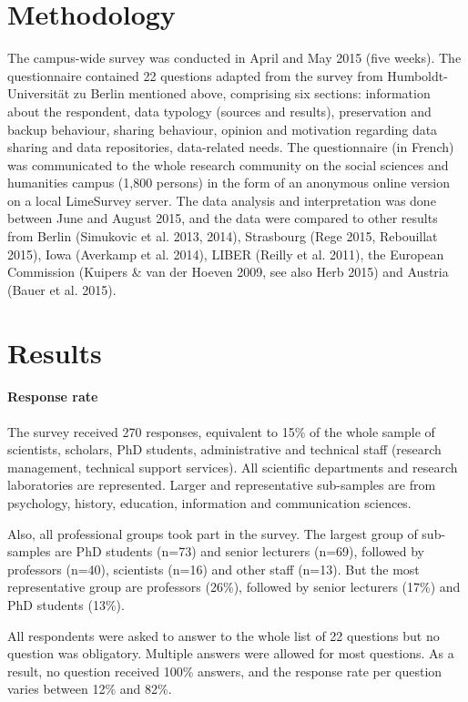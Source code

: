 \documentclass[a4paper,
fontsize=11pt,
oneside,
numbers=noperiodatend,
parskip=half-,
bibliography=totoc,
final
]{scrartcl}
\begin{document}
\section*{Methodology}\label{methodology}

The campus-wide survey was conducted in April and May 2015 (five weeks).
The questionnaire contained 22 questions adapted from the survey from
Humboldt-Universität zu Berlin mentioned above, comprising six sections:
information about the respondent, data typology (sources and results),
preservation and backup behaviour, sharing behaviour, opinion and
motivation regarding data sharing and data repositories, data-related
needs. The questionnaire (in French) was communicated to the whole
research community on the social sciences and humanities campus (1,800
persons) in the form of an anonymous online version on a local
LimeSurvey server. The data analysis and interpretation was done between
June and August 2015, and the data were compared to other results from
Berlin (Simukovic et al. 2013, 2014), Strasbourg (Rege 2015, Rebouillat
2015), Iowa (Averkamp et al. 2014), LIBER (Reilly et al. 2011), the
European Commission (Kuipers \& van der Hoeven 2009, see also Herb 2015)
and Austria (Bauer et al. 2015).

\section*{Results}\label{results}

\paragraph{Response rate}\label{response-rate}

The survey received 270 responses, equivalent to 15\% of the whole
sample of scientists, scholars, PhD students, administrative and
technical staff (research management, technical support services). All
scientific departments and research laboratories are represented. Larger
and representative sub-samples are from psychology, history, education,
information and communication sciences.

Also, all professional groups took part in the survey. The largest group
of sub-samples are PhD students (n=73) and senior lecturers (n=69),
followed by professors (n=40), scientists (n=16) and other staff (n=13).
But the most representative group are professors (26\%), followed by
senior lecturers (17\%) and PhD students (13\%).

All respondents were asked to answer to the whole list of 22 questions
but no question was obligatory. Multiple answers were allowed for most
questions. As a result, no question received 100\% answers, and the
response rate per question varies between 12\% and 82\%.
\end{document}
